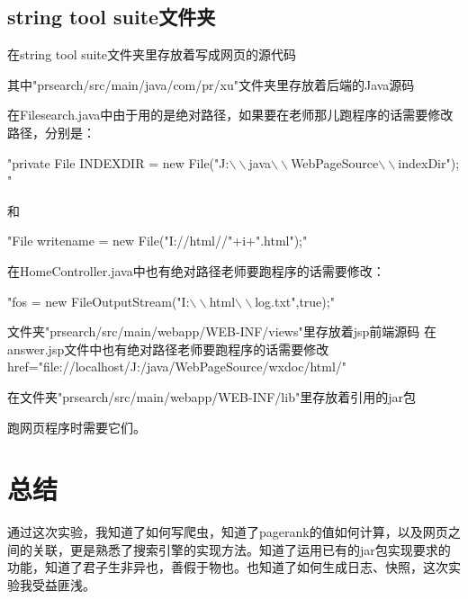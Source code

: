 ﻿\documentclass[UTF8]{ctexart}
\begin{document}
\begin{flushleft}
\subsection{string tool suite文件夹}
    在string tool suite文件夹里存放着写成网页的源代码
\par{}
    其中"prsearch/src/main/java/com/pr/xu"文件夹里存放着后端的Java源码
\par{}
    在Filesearch.java中由于用的是绝对路径，如果要在老师那儿跑程序的话需要修改路径，分别是：
\par{}
    "private File INDEXDIR = new File("J:$\backslash\backslash$java$\backslash\backslash$WebPageSource$\backslash\backslash$indexDir"); "
\par{}
    和
\par{}
    "File writename = new File("I://html//"+i+".html");"
\par{}
    在HomeController.java中也有绝对路径老师要跑程序的话需要修改：
\par{}
    "fos = new FileOutputStream("I:$\backslash\backslash$html$\backslash\backslash$log.txt",true);"
\par{}
    文件夹"prsearch/src/main/webapp/WEB-INF/views"里存放着jsp前端源码
    在answer.jsp文件中也有绝对路径老师要跑程序的话需要修改
    href="file://localhost/J:/java/WebPageSource/wxdoc/html/"
\par{}
    在文件夹"prsearch/src/main/webapp/WEB-INF/lib"里存放着引用的jar包
\par{}
    跑网页程序时需要它们。
\section{总结}
    通过这次实验，我知道了如何写爬虫，知道了pagerank的值如何计算，以及网页之间的关联，更是熟悉了搜索引擎的实现方法。知道了运用已有的jar包实现要求的功能，知道了君子生非异也，善假于物也。也知道了如何生成日志、快照，这次实验我受益匪浅。
\end{flushleft}
\end{document}
